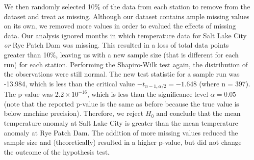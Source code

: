 We then randomly selected 10\% of the data from each station to remove from the dataset and treat as missing. Although our dataset contains ample missing values on its own, we removed more values in order to evalued the effects of missing data. Our analysis ignored months in which temperature data for Salt Lake City \textit{or} Rye Patch Dam was missing. This resulted in a loss of total data points greater than 10\%, leaving us with a new sample size (that is different for each run) for each station. Performing the Shapiro-Wilk test again, the distribution of the observations were still normal. The new test statistic for a sample run was -13.984, which is less than the critical value  $-t_{n-1,\alpha/2} = -1.648$ (where n = 397). The p-value was $2.2 \times 10^{-16}$, which is less than the significance level $\alpha = 0.05$ (note that the reported p-value is the same as before because the true value is below machine precision). Therefore, we reject $H_{0}$ and conclude that the mean temperature anomaly at Salt Lake City is greater than the mean temperature anomaly at Rye Patch Dam. The addition of more missing values reduced the sample size and (theoretically) resulted in a higher p-value, but did not change the outcome of the hypothesis test.